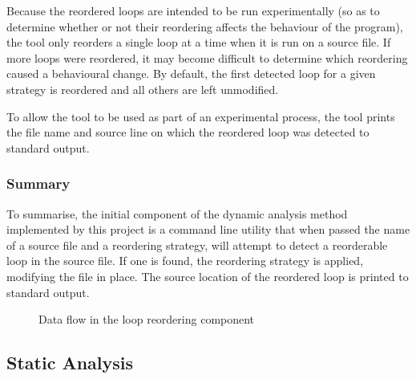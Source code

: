 \documentclass[journal]{IEEEtran}
\begin{document}
Because the reordered loops are intended to be run experimentally (so as to
determine whether or not their reordering affects the behaviour of the program),
the tool only reorders a single loop at a time when it is run on a source file.
If more loops were reordered, it may become difficult to determine which
reordering caused a behavioural change. By default, the first detected loop for
a given strategy is reordered and all others are left unmodified.

To allow the tool to be used as part of an experimental process, the tool prints
the file name and source line on which the reordered loop was detected to
standard output.

\subsubsection{Summary}

To summarise, the initial component of the dynamic analysis method implemented
by this project is a command line utility that when passed the name of a source
file and a reordering strategy, will attempt to detect a reorderable loop in the
source file. If one is found, the reordering strategy is applied, modifying the
file in place. The source location of the reordered loop is printed to standard
output.

\begin{figure}[h] 
  \centering 
  \caption{Data flow in the loop reordering component}
  \label{fig:tool}
\end{figure}


\subsection{Static Analysis}
\end{document}
